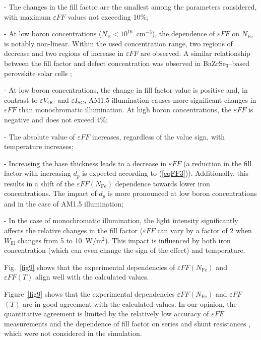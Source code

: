 \documentclass[a4paper,fleqn]{cas-sc}
\begin{document}
\noindent
- The changes in the fill factor are the smallest among the parameters considered,
with maximum $\varepsilon F\!F$ values not exceeding 10\%;

\noindent
- At low boron concentrations ($N_\mathrm{B}<10^{16}$~cm$^{-3}$),
the dependence of $\varepsilon F\!F$ on $N_\mathrm{Fe}$ is notably non-linear.
Within the used concentration range, two regions of decrease and two regions of increase in $\varepsilon F\!F$ are observed.
A similar relationship between the fill factor and defect concentration was observed in BaZrSe$_3$--based perovskite solar cells \cite{MasumMia2025};

\noindent
- At low boron concentrations, the change in fill factor value is positive and,
in contrast to $\varepsilon V_\mathrm{OC}$ and $\varepsilon I_\mathrm{SC}$,
AM1.5 illumination causes more significant changes in $\varepsilon F\!F$ than monochromatic illumination.
At high boron concentrations, the $\varepsilon F\!F$ is negative and does not exceed 4\%;


\noindent
- The absolute value of $\varepsilon F\!F$ increases, regardless of the value sign, with temperature increases;


\noindent
- Increasing the base thickness leads to a decrease in $\varepsilon F\!F$ (a reduction in the fill factor with increasing $d_p$ is expected according to (\ref{eqFF3})). Additionally, this results in a shift of the $\varepsilon F\!F\left(N_\mathrm{Fe}\right)$ dependence towards lower iron concentrations.
The impact of $d_p$ is more pronounced at low boron concentrations and in the case of AM1.5 illumination;


\noindent
- In the case of monochromatic illumination, the light intensity significantly affects the relative changes in the fill factor
($\varepsilon F\!F$ can vary by a factor of 2 when $W_\mathrm{ill}$ changes from 5 to 10~W/m$^{2}$).
This impact is influenced by both iron concentration (which can even change the sign of the effect) and temperature.

Fig.~\ref{fig9} shows that the experimental dependencies of  $\varepsilon F\!F\left(N_\mathrm{Fe}\right)$
and $\varepsilon F\!F\left(T\right)$ align well with the calculated values.

Figure~\ref{fig9} shows that the experimental dependencies $\varepsilon F\!F$$\left(N_\mathrm{Fe}\right)$ and $\varepsilon F\!F$$\left(T\right)$ are in good agreement with the calculated values.
In our opinion, the quantitative agreement is limited by the relatively low accuracy of $\varepsilon F\!F$ measurements
and the dependence of fill factor on series and shunt resistances \cite{Green1981,Green1982},
which were not considered in the simulation.
\end{document}
